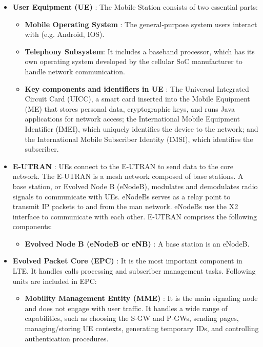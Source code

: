 \documentclass[conference]{IEEEtran}
\begin{document}
\begin{itemize}
    \item \textbf{User Equipment (UE)} : The Mobile Station consists of two essential parts:
    \begin{itemize}
        \item \textbf{Mobile Operating System }: The general-purpose system users interact with (e.g. Android, IOS).
        \item \textbf{Telephony Subsystem}: It includes a baseband processor, which has its own operating system developed by the cellular SoC manufacturer to handle network communication\cite{cichonski2016guide}.

    
    \item  \textbf{Key components and identifiers in UE} : The Universal Integrated Circuit Card (UICC), a smart card inserted into the Mobile Equipment (ME) that stores personal data, cryptographic keys, and runs Java applications for network access; the International Mobile Equipment Identifier (IMEI), which uniquely identifies the device to the network; and the International Mobile Subscriber Identity (IMSI), which identifies the subscriber\cite{cichonski2016guide}.


    
\end{itemize}
    \item \textbf{E-UTRAN} : UEs connect to the E-UTRAN to send data to the core network. The E-UTRAN is a mesh network composed of base stations. A base station, or Evolved Node B (eNodeB), modulates and demodulates radio signals to communicate with UEs. eNodeBs serves as a relay point to transmit IP packets to and from the man network. eNodeBs use the X2 interface to communicate with each other\cite{cichonski2016guide}. E-UTRAN comprises the following components: 

    
        
    \begin{itemize}
        \item \textbf{Evolved Node B (eNodeB or eNB)} : A base station is an eNodeB.
     
    \end{itemize}

    \item \textbf{Evolved Packet Core (EPC)} : It is the most important component in LTE. It handles calls processing and subscriber management tasks. Following units are included in EPC:
    \begin{itemize}
        \item \textbf{Mobility Management Entity (MME)} : It is the main signaling node and does not engage with user traffic. It handles a wide range of capabilities, such as choosing the S-GW and P-GWs, sending pages, managing/storing UE contexts, generating temporary IDs, and controlling authentication procedures\cite{cichonski2016guide}.


\end{itemize}
\end{itemize}
\end{document}
